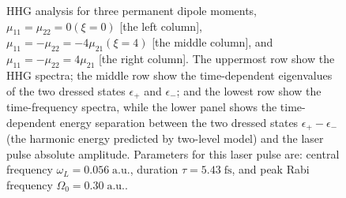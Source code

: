 \documentclass[10pt,letterpaper]{article}
\begin{document}
\begin{figure}[h]
	\caption{HHG analysis for three permanent dipole moments, $\mu_{11}=\mu_{22}=0(\xi=0)$ [the left column], $\mu_{11}=-\mu_{22}=-4\mu_{21} (\xi=4)$ [the middle column], and $\mu_{11}=-\mu_{22}=4\mu_{21}$ [the right column]. The uppermost row show the HHG spectra; the middle row show the time-dependent eigenvalues of the two dressed states $\epsilon_{+}$ and $\epsilon_{-}$; and the lowest row show the time-frequency spectra, while the lower panel shows the time-dependent energy separation between the two dressed states $\epsilon_{+}-\epsilon_{-}$ (the harmonic energy predicted by two-level model) and the laser pulse absolute amplitude. Parameters for this laser pulse are: central frequency $\omega_L=0.056\;\text{a.u.}$, duration $\tau=5.43\;\text{fs}$, and peak Rabi frequency $\Omega_0=0.30\;\text{a.u.}$.}

\end{figure}
\end{document}
